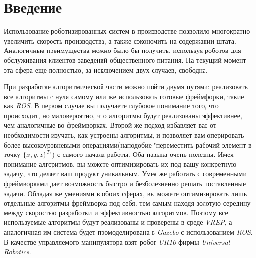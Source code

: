 \chapter*{Введение}						%

\newcommand{\actuality}{}
\newcommand{\progress}{}
\newcommand{\aim}{{\textbf\aimTXT}}
\newcommand{\tasks}{\textbf{\tasksTXT}}
\newcommand{\novelty}{\textbf{\noveltyTXT}}
\newcommand{\influence}{\textbf{\influenceTXT}}
\newcommand{\methods}{\textbf{\methodsTXT}}
\newcommand{\defpositions}{\textbf{\defpositionsTXT}}
\newcommand{\reliability}{\textbf{\reliabilityTXT}}
\newcommand{\probation}{\textbf{\probationTXT}}
\newcommand{\contribution}{\textbf{\contributionTXT}}
\newcommand{\publications}{\textbf{\publicationsTXT}}

Использование роботизированных систем в производстве позволило многократно увеличить скорость производства, а также сэкономить на содержании штата. Аналогичные преимущества можно было бы получить, используя роботов для обслуживания клиентов заведений общественного питания. На текущий момент эта сфера еще полностью, за исключением двух случаев, свободна.

При разработке алгоритмической части можно пойти двумя путями: реализовать все алгоритмы с нуля самому или же использовать готовые фреймфорки, такие как \textit{ROS}. В первом случае вы получаете глубокое понимание того, что происходит, но маловероятно, что алгоритмы будут реализованы эффективнее, чем аналогичные во фреймворках. Второй же подход избавляет вас от необходимости изучать, как устроены алгоритмы, и позволяет вам оперировать более высокоуровневыми операциями(наподобие "переместить рабочий элемент в точку $\{x, y, z\}^{T}$") с самого начала работы. Оба навыка очень полезны. Имея понимание алгоритмов, вы можете оптимизировать их под вашу конкретную задачу, что делает ваш продукт уникальным. Умея же работать с современными фреймворками дает возможность быстро и безболезненно решать поставленные задачи. Обладая же умениями в обоих сферах, вы можете оптимизировать лишь отдельные алгоритмы фреймворка под себя, тем самым находя золотую середину между скоростью разработки и эффективностью алгоритмов. Поэтому все используемые алгоритмы будут реализованы и проверены в среде \textit{VREP}, а аналогичная им система будет промоделирована в \textit{Gazebo} с использованием \textit{ROS}. В качестве управляемого манипулятора взят робот \textit{UR10} фирмы \textit{Universal Robotics}.

